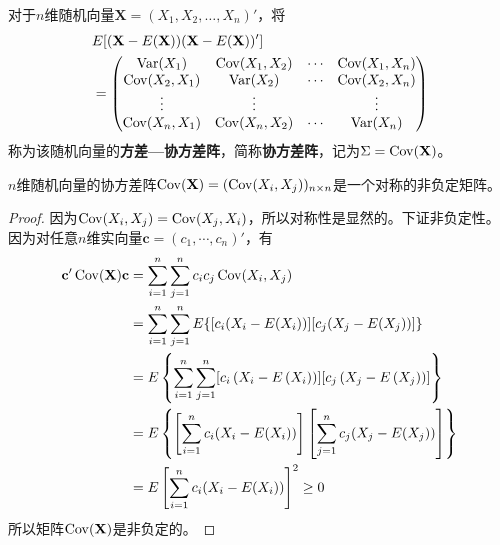 \begin{definition}[协方差矩阵]
    对于$n$维随机向量$\mathbf{X}=(X_1,X_2,\ldots,X_n)'$，将
    \begin{align*}
         & E[(\mathbf{X}-E(\mathbf{X}))(\mathbf{X}-E(\mathbf{X}))' ] \\
         & =\begin{pmatrix}
                \operatorname{Var}(X_1)     & \operatorname{Cov}(X_1,X_2) & \cdots & \operatorname{Cov}(X_1,X_n) \\
                \operatorname{Cov}(X_2,X_1) & \operatorname{Var}(X_2)     & \cdots & \operatorname{Cov}(X_2,X_n) \\
                \vdots        & \vdots        &        & \vdots        \\
                \operatorname{Cov}(X_n,X_1) & \operatorname{Cov}(X_n,X_2) & \cdots & \operatorname{Var}(X_n)
            \end{pmatrix}
    \end{align*}
    称为该随机向量的\textbf{方差—协方差阵}，简称\textbf{协方差阵}，记为$\Sigma=\operatorname{Cov}(\mathbf{X})$。
\end{definition}

\begin{theorem}
   $n$维随机向量的协方差阵$\operatorname{Cov}(\mathbf{X})=(\operatorname{Cov}(X_i,X_j))_{n\times n}$是一个对称的非负定矩阵。
\end{theorem}
\begin{proof}
    因为$\operatorname{Cov}(X_i,X_j)=\operatorname{Cov}(X_j,X_i)$，所以对称性是显然的。下证非负定性。因为对任意$n$维实向量$\mathbf{c}=(c_1,\cdots ,c_n)'$，有
    \begin{align*}
        \mathbf{c}'\operatorname{Cov}(\mathbf{X})\mathbf{c} & = \sum_{i=1}^n\sum_{j=1}^n c_i c_j \operatorname{Cov}(X_i,X_j)                                                                           \\
                                              & = \sum_{i=1}^n\sum_{j=1}^n E\{ [c_i(X_i-E(X_i))] [c_j(X_j-E(X_j))] \}                                                      \\
                                              & = E\left\{\sum_{i=1}^n \sum_{j=1}^n [c_i\left(X_i-E\left(X_i\right)\right)][c_j\left(X_j-E\left(X_j\right)\right)]\right\} \\
                                              & = E\left\{\left[\sum_{i=1}^n c_i(X_i-E(X_i))\right]\left[\sum_{j=1}^n  c_j(X_j-E(X_j))\right]\right\}                      \\
                                              & = E\left[\sum_{i=1}^n  c_i(X_i-E(X_i))\right]^2 \ge 0
    \end{align*}
    所以矩阵$\operatorname{Cov}(\mathbf{X})$是非负定的。
\end{proof}

